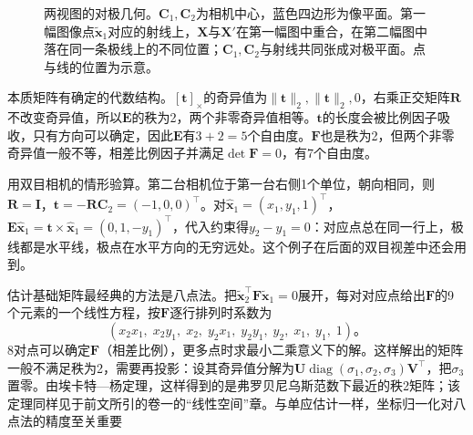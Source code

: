 \begin{figure}[htbp]
  \centering
  
  \caption{两视图的对极几何。$\bm C_1,\bm C_2$为相机中心，蓝色四边形为像平面。第一幅图像点$\tilde{\bm x}_1$对应的射线上，$\bm X$与$\bm X'$在第一幅图中重合，在第二幅图中落在同一条极线上的不同位置；$\bm C_1,\bm C_2$与射线共同张成对极平面。点与线的位置为示意。}
  \label{fig:vision-formation-epipolar}
\end{figure}

本质矩阵有确定的代数结构。$[\bm t]_\times$的奇异值为$\lVert\bm t\rVert_2,\lVert\bm t\rVert_2,0$，右乘正交矩阵$\bm R$不改变奇异值，所以$\bm E$的秩为2，两个非零奇异值相等。$\bm t$的长度会被比例因子吸收，只有方向可以确定，因此$\bm E$有$3+2=5$个自由度。$\bm F$也是秩为2，但两个非零奇异值一般不等，相差比例因子并满足$\det\bm F=0$，有7个自由度。

用双目相机的情形验算。第二台相机位于第一台右侧1个单位，朝向相同，则$\bm R=\bm I$，$\bm t=-\bm R\bm C_2=(-1,0,0)^\top$。对$\hat{\bm x}_1=(x_1,y_1,1)^\top$，$\bm E\hat{\bm x}_1=\bm t\times\hat{\bm x}_1=(0,1,-y_1)^\top$，代入约束得$y_2-y_1=0$：对应点总在同一行上，极线都是水平线，极点在水平方向的无穷远处。这个例子在后面的双目视差中还会用到。

估计基础矩阵最经典的方法是八点法。把$\tilde{\bm x}_2^\top\bm F\tilde{\bm x}_1=0$展开，每对对应点给出$\bm F$的9个元素的一个线性方程，按$\bm F$逐行排列时系数为
\[
  (x_2x_1,\;x_2y_1,\;x_2,\;y_2x_1,\;y_2y_1,\;y_2,\;x_1,\;y_1,\;1)\text{。}
\]
8对点可以确定$\bm F$（相差比例），更多点时求最小二乘意义下的解。这样解出的矩阵一般不满足秩为2，需要再投影：设其奇异值分解为$\bm U\operatorname{diag}(\sigma_1,\sigma_2,\sigma_3)\bm V^\top$，把$\sigma_3$置零。由埃卡特—杨定理，这样得到的是弗罗贝尼乌斯范数下最近的秩2矩阵；该定理同样见于前文所引的卷一的“线性空间”章。与单应估计一样，坐标归一化对八点法的精度至关重要

